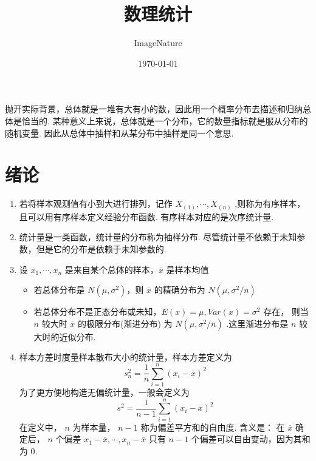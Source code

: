 \documentclass[a5paper,12pt]{article}
\title{数理统计}
\author{ImageNature}
\date{\today}
\begin{document}
\maketitle


抛开实际背景，总体就是一堆有大有小的数，因此用一个概率分布去描述和归纳总体是恰当的.
某种意义上来说，总体就是一个分布，它的数量指标就是服从分布的随机变量.
因此从总体中抽样和从某分布中抽样是同一个意思.
\section{绪论}

\begin{enumerate}
  \item 若将样本观测值有小到大进行排列，记作 $X_{(1)},\cdots,X_{(n)}$ ,则称为有序样本，且可以用有序样本定义经验分布函数. 有序样本对应的是次序统计量.
  \item 统计量是一类函数，统计量的分布称为抽样分布. 尽管统计量不依赖于未知参数，但是它的分布是依赖于未知参数的.
  \item 设 $x_1,\cdots,x_n$ 是来自某个总体的样本，$\overline{x}$ 是样本均值
  \begin{itemize}
    \item 若总体分布是 $N(\mu,\sigma^2)$，则 $\overline{x}$ 的精确分布为 $N(\mu,\sigma^2/n)$
    \item 若总体分布不是正态分布或未知，$E(x) = \mu,Var(x) = \sigma^2$ 存在，
    则当 $n$ 较大时 $\overline{x}$ 的极限分布(渐进分布) 为 $N(\mu,\sigma^2/n)$ .这里渐进分布是 $n$ 较大时的近似分布.
  \end{itemize}
 \item 样本方差时度量样本散布大小的统计量，样本方差定义为
 \[
 s_n^2 = \frac1 n \sum_{i=1}^{n} (x_i - \overline{x})^2
 \]
 为了更方便地构造无偏统计量，一般会定义为
 \[
 s^2 = \frac{1}{n-1}\sum_{i=1}^{n}(x_i - \overline{x})^2
 \]
 在定义中， $n$ 为样本量， $n-1$ 称为偏差平方和的自由度. 含义是：
 在 $\overline{x}$ 确定后， $n$ 个偏差 $x_1 - \overline{x},\cdots,x_n - \overline{x}$ 只有
 $n-1$ 个偏差可以自由变动，因为其和为 $0$.
\end{enumerate}
\end{document}
